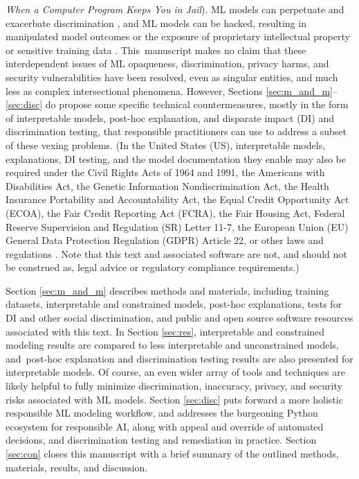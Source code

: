 \documentclass[information,article,accept,moreauthors,pdftex]{Definitions/mdpi}
\begin{document}
{\textit{When a Computer Program Keeps You in Jail}}). ML models can perpetuate and exacerbate discrimination \cite{feldman2015certifying,dwork2012fairness,gender_shades}, and ML models can be hacked, resulting in manipulated model outcomes or the exposure of proprietary intellectual property or sensitive training data \cite{security_of_ml,model_stealing,membership_inference,shokri2019privacy}. This~manuscript makes no claim that these interdependent issues of ML opaqueness, discrimination, privacy harms, and security vulnerabilities have been resolved, even as singular entities, and much less as complex intersectional phenomena. However, Sections \ref{sec:m_and_m}--\ref{sec:disc} do propose some specific technical countermeasures, mostly in the form of interpretable models, post-hoc explanation, and disparate impact (DI) and discrimination testing, that responsible practitioners can use to address a subset of these vexing problems. (In the United States (US), interpretable models, explanations, DI testing, and the model documentation they enable may also be required under the Civil Rights Acts of 1964 and 1991, the Americans with Disabilities Act, the Genetic Information Nondiscrimination Act, the Health Insurance Portability and Accountability Act, the Equal Credit Opportunity Act (ECOA), the Fair Credit Reporting Act (FCRA), the Fair Housing Act, Federal Reserve Supervision and Regulation (SR) Letter 11-7, the European Union (EU) General Data Protection Regulation (GDPR) Article 22, or other laws and regulations \cite{ff_interpretability}. Note that this text and associated software are not, and should not be construed as, legal advice or regulatory compliance requirements.)

Section \ref{sec:m_and_m} describes methods and materials, including training datasets, interpretable and constrained models, post-hoc explanations, tests for DI and other social discrimination, and public and open source software resources associated with this text. In Section \ref{sec:res}, interpretable and constrained modeling results are compared to less interpretable and unconstrained models, and~post-hoc explanation and discrimination testing results are also presented for interpretable models. Of course, an even wider array of tools and techniques are likely helpful to fully minimize discrimination, inaccuracy, privacy, and security risks associated with ML models. Section \ref{sec:disc} puts forward a more holistic responsible ML modeling workflow, and addresses the burgeoning Python ecosystem for responsible AI, along with appeal and override of automated decisions, and discrimination testing and remediation in practice. Section \ref{sec:con} closes this manuscript with a brief summary of the outlined methods, materials, results, and discussion.
\end{document}
